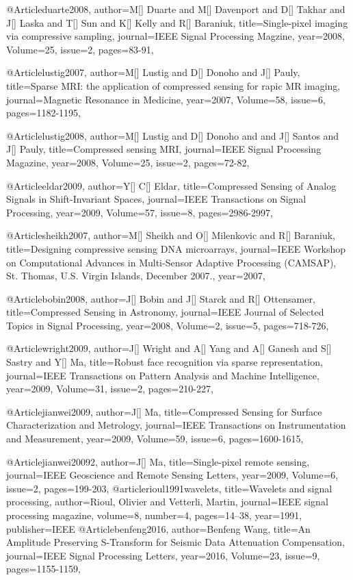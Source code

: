 {@Article{duarte2008,
  author={M[] Duarte and M[] Davenport and D[] Takhar and J[] Laska and T[] Sun and K[] Kelly and R[] Baraniuk},
  title={Single-pixel imaging via compressive sampling},
  journal={IEEE Signal Processing Magzine},
  year=2008,
  Volume=25,
  issue=2,
  pages={83-91},
}

@Article{lustig2007,
  author={M[] Lustig and D[] Donoho and J[] Pauly},
  title={Sparse MRI: the application of compressed sensing for rapic MR imaging},
  journal={Magnetic Resonance in Medicine},
  year=2007,
  Volume=58,
  issue=6,
  pages={1182-1195},
}

@Article{lustig2008,
  author={M[] Lustig and D[] Donoho and and J[] Santos and J[] Pauly},
  title={Compressed sensing MRI},
  journal={IEEE Signal Processing Magazine},
  year=2008,
  Volume=25,
  issue=2,
  pages={72-82},
}

@Article{eldar2009,
  author={Y[] C[] Eldar},
  title={Compressed Sensing of Analog Signals in Shift-Invariant Spaces},
  journal={IEEE Transactions on Signal Processing},
  year=2009,
  Volume=57,
  issue=8,
  pages={2986-2997},
}

@Article{sheikh2007,
  author={M[] Sheikh and O[] Milenkovic and R[] Baraniuk},
  title={Designing compressive sensing DNA microarrays},
  journal={IEEE Workshop on Computational Advances in Multi-Sensor Adaptive
Processing (CAMSAP), St. Thomas, U.S. Virgin Islands, December 2007.},
  year=2007,
}

@Article{bobin2008,
  author={J[] Bobin and J[] Starck and R[] Ottensamer},
  title={Compressed Sensing in Astronomy},
  journal={IEEE Journal of Selected Topics in Signal Processing},
  year=2008,
  Volume=2,
  issue=5,
  pages={718-726},
}

@Article{wright2009,
  author={J[] Wright and A[] Yang and A[] Ganesh and S[] Sastry and Y[] Ma},
  title={Robust face recognition via sparse representation},
  journal={IEEE Transactions on Pattern Analysis and Machine Intelligence},
  year=2009,
  Volume=31,
  issue=2,
  pages={210-227},
}

@Article{jianwei2009,
  author={J[] Ma},
  title={Compressed Sensing for Surface Characterization and Metrology},
  journal={IEEE Transactions on Instrumentation and Measurement},
  year=2009,
  Volume=59,
  issue=6,
  pages={1600-1615},
}

@Article{jianwei20092,
  author={J[] Ma},
  title={Single-pixel remote sensing},
  journal={IEEE Geoscience and Remote Sensing Letters},
  year=2009,
  Volume=6,
  issue=2,
  pages={199-203},
}
@article{rioul1991wavelets,
  title={Wavelets and signal processing},
  author={Rioul, Olivier and Vetterli, Martin},
  journal={IEEE signal processing magazine},
  volume={8},
  number={4},
  pages={14--38},
  year={1991},
  publisher={IEEE}
}
@Article{benfeng2016,
  author={Benfeng Wang},
  title={An Amplitude Preserving S-Transform for Seismic Data Attenuation Compensation},
  journal={IEEE Signal Processing Letters},
  year=2016,
  Volume=23,
  issue=9,
  pages={1155-1159},
}

}
